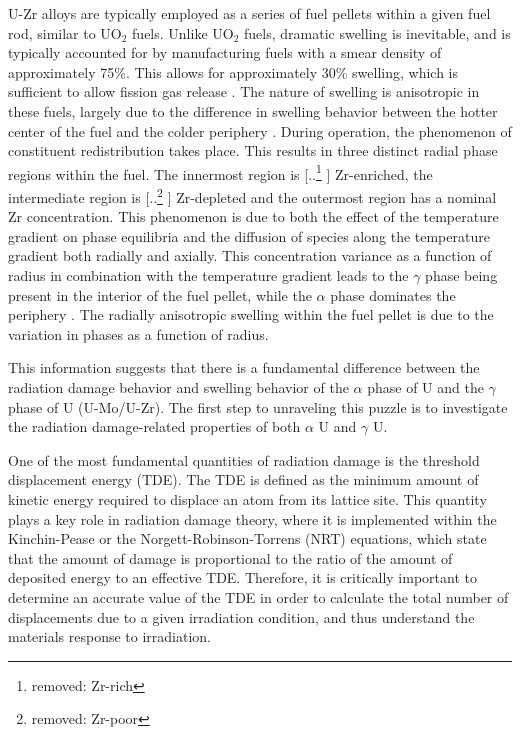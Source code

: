 \documentclass[review]{elsarticle}
\providecommand{\DIFaddtex}[1]{{\protect\color{blue} \sf #1}} %
\providecommand{\DIFdeltex}[1]{{\protect\color{red} [..\footnote{removed: #1} ]}} %
\providecommand{\DIFaddbegin}{} %
\providecommand{\DIFaddend}{} %
\providecommand{\DIFdelbegin}{} %
\providecommand{\DIFdelend}{} %
\providecommand{\DIFadd}[1]{\texorpdfstring{\DIFaddtex{#1}}{#1}} %
\providecommand{\DIFdel}[1]{\texorpdfstring{\DIFdeltex{#1}}{}} %
\newcommand{\DIFscaledelfig}{0.5}
\newlength{\DIFdelgraphicswidth} %
\newlength{\DIFdelgraphicsheight} %
\newcommand{\DIFaddincludegraphics}[2][]{{\color{blue}\fbox{\DIFOincludegraphics[#1]{#2}}}} %
\newcommand{\DIFdelincludegraphics}[2][]{%
\sbox{\DIFdelgraphicsbox}{\DIFOincludegraphics[#1]{#2}}%
\settoboxwidth{\DIFdelgraphicswidth}{\DIFdelgraphicsbox} %
\settoboxtotalheight{\DIFdelgraphicsheight}{\DIFdelgraphicsbox} %
\scalebox{\DIFscaledelfig}{%
\parbox[b]{\DIFdelgraphicswidth}{\usebox{\DIFdelgraphicsbox}\\[-\baselineskip] \rule{\DIFdelgraphicswidth}{0em}}\llap{\resizebox{\DIFdelgraphicswidth}{\DIFdelgraphicsheight}{%
\setlength{\unitlength}{\DIFdelgraphicswidth}%
\begin{picture}(1,1)%
\thicklines\linethickness{2pt} %
{\color[rgb]{1,0,0}\put(0,0){\framebox(1,1){}}}%
{\color[rgb]{1,0,0}\put(0,0){\line( 1,1){1}}}%
{\color[rgb]{1,0,0}\put(0,1){\line(1,-1){1}}}%
\end{picture}%
}\hspace*{3pt}}} %
} %
\DeclareRobustCommand{\DIFaddbegin}{\DIFOaddbegin \let\includegraphics\DIFaddincludegraphics} %
\DeclareRobustCommand{\DIFaddend}{\DIFOaddend \let\includegraphics\DIFOincludegraphics} %
\DeclareRobustCommand{\DIFdelbegin}{\DIFOdelbegin \let\includegraphics\DIFdelincludegraphics} %
\DeclareRobustCommand{\DIFdelend}{\DIFOaddend \let\includegraphics\DIFOincludegraphics} %
\begin{document}
U-Zr alloys are typically employed as a series of fuel pellets within a given fuel rod, similar to UO$_{2}$ fuels. Unlike UO$_{2}$ fuels, dramatic swelling is inevitable, and is typically accounted for by manufacturing fuels with a smear density of approximately 75{\%}. This allows for approximately 30\% swelling, which is sufficient to allow fission gas release \cite{beck1968}. The nature of swelling is anisotropic in these fuels, largely due to the difference in swelling behavior between the hotter center of the fuel and the colder periphery \cite{hofman1990}. During operation, the phenomenon of constituent redistribution takes place. This results in three distinct radial phase regions within the fuel. The innermost region is \DIFdelbegin \DIFdel{Zr-rich}\DIFdelend \DIFaddbegin \DIFadd{Zr-enriched}\DIFaddend , the intermediate region is \DIFdelbegin \DIFdel{Zr-poor }\DIFdelend \DIFaddbegin \DIFadd{Zr-depleted }\DIFaddend and the outermost region has a nominal Zr concentration. This phenomenon is due to both the effect of the temperature gradient on phase equilibria and the diffusion of species along the temperature gradient both radially and axially. This concentration variance as a function of radius in combination with the temperature gradient leads to the $\gamma$ phase being present in the interior of the fuel pellet, while the $\alpha$ phase dominates the periphery \cite{kobayashi1990, kim2004}. The radially anisotropic swelling within the fuel pellet is due to the variation in phases as a function of radius.

This information suggests that there is a fundamental difference between the radiation damage behavior and swelling behavior of the $\alpha$ phase of U and the $\gamma$ phase of U (U-Mo/U-Zr). The first step to unraveling this puzzle is to investigate the radiation damage-related properties of both $\alpha$ U and $\gamma$ U.

One of the most fundamental quantities of radiation damage is the threshold displacement energy (TDE). The TDE is defined as the minimum amount of kinetic energy required to displace an atom from its lattice site. This quantity plays a key role in radiation damage theory, where it is implemented within the Kinchin-Pease \cite{kinchinpease} or the Norgett-Robinson-Torrens (NRT) \cite{norgett1975} equations, which state that the amount of damage is proportional to the ratio of the amount of deposited energy to an effective TDE. Therefore, it is critically important to determine an accurate value of the TDE in order to calculate the total number of displacements due to a given irradiation condition, and thus understand the materials response to irradiation.
\end{document}
